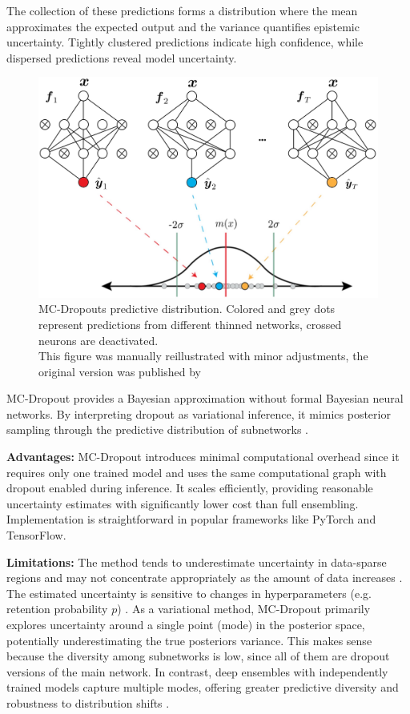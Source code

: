 The collection of these predictions forms a distribution where the mean approximates the expected
output and the variance quantifies epistemic uncertainty. Tightly clustered predictions indicate
high confidence, while dispersed predictions reveal model uncertainty.

\begin{figure}[htbp]
    \centering
    \includegraphics[width=0.65\linewidth]{figures/fig_mcd.png}
    \caption{MC-Dropouts predictive distribution. Colored and grey dots represent predictions from different thinned networks, crossed neurons are deactivated.\\This figure was manually reillustrated with minor adjustments, the original version was published by \citet{Katwyk2023}}
    \label{fig:mc-dropout2}
\end{figure}

MC-Dropout provides a Bayesian approximation without formal Bayesian neural networks.
By interpreting dropout as variational inference, it mimics posterior sampling through the predictive
distribution of subnetworks \citep{gal2016mcdropout}.

\vspace{0.15cm}
\textbf{Advantages:} MC-Dropout introduces minimal computational overhead since it requires only one
trained model and uses the same computational graph with dropout enabled during inference. It scales
efficiently, providing reasonable uncertainty estimates with significantly lower cost than full
ensembling. Implementation is straightforward in popular frameworks like PyTorch and TensorFlow.

\vspace{0.15cm}
\textbf{Limitations:} The method tends to underestimate uncertainty in data-sparse regions and may not
concentrate appropriately as the amount of data increases \citep{osband2016}.
The estimated uncertainty is sensitive to changes in hyperparameters (e.g. retention probability $p$)
\citep{verdoja2021behaviormcdropout}.
As a variational method, MC-Dropout primarily explores uncertainty around a single point (mode) in the
posterior space, potentially underestimating the true posteriors variance. This makes sense because the
diversity among subnetworks is low, since all of them are dropout versions of the main network.
In contrast, deep ensembles with independently trained models capture multiple modes, offering
greater predictive diversity and robustness to distribution shifts \citep{fort2020deepensembles}.

